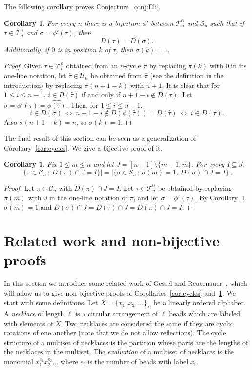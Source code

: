 \documentclass[11pt]{amsart}
\newtheorem{corollary}[theorem]{Corollary}
\renewcommand\S{\mathcal S}
\newcommand\C{\mathcal C}
\newcommand\wh{\widehat}
\newcommand\T{{\mathcal T}}
\newcommand\U{{\mathcal U}}
\newcommand\biju{\phi}
\begin{document}
The following corollary proves Conjecture~\ref{conj:Eli}.
\begin{corollary}\label{cor:Elishift} For every $n$ there is a bijection $\biju'$ between $\T^0_{n}$ and $\S_n$ such that if $\tau\in\T^0_n$ and $\sigma=\biju'(\tau)$, then
$$D(\tau)=D(\sigma).$$
Additionally, if $0$ is in position $k$ of $\tau$, then $\sigma(k)=1$.
\end{corollary}

\begin{proof}
Given $\tau\in\T^0_n$ obtained from an $n$-cycle $\pi$ by replacing $\pi(k)$ with $0$ in its one-line notation, let $\wh\tau\in\U_n$ be obtained from $\wh\pi$ (see the definition in the introduction) by replacing $\wh\pi(n+1-k)$ with $n+1$.
It is clear that for $1\le i\le n-1$, $i\in D(\wh\tau)$ if and only if $n+1-i\notin D(\tau)$. Let $\sigma=\biju'(\tau)=\wh{\biju(\wh\tau)}$. Then, for $1\le i\le n-1$,
$$i\in D(\sigma) \ \Leftrightarrow\  n+1-i\notin D(\biju(\wh\tau))=D(\wh\tau) \ \Leftrightarrow\ i\in D(\tau).$$ Also $\wh\sigma(n+1-k)=n$, so $\sigma(k)=1$.
\end{proof}

The final result of this section can be seen as a generalization of Corollary~\ref{cor:cycles}. We give a bijective proof of it.

\begin{corollary}\label{cor:cyclesu} Fix $1\le m\le n$ and let $J=[n-1]\setminus\{m-1,m\}$. For every $I\subseteq J$,
$$|\{\pi\in\C_{n}\,:\,D(\pi)\cap J=I\}|=|\{\sigma\in\S_{n}\,:\,\sigma(m)=1,\,D(\sigma)\cap J=I\}|.$$
\end{corollary}

\begin{proof}
Let $\pi\in\C_n$ with $D(\pi)\cap J=I$. Let $\tau\in\T^0_n$ be obtained by replacing $\pi(m)$ with $0$ in the one-line notation of $\pi$, and let $\sigma=\biju'(\tau)$. By Corollary~\ref{cor:Elishift}, $\sigma(m)=1$
and $D(\sigma)\cap J=D(\tau)\cap J=D(\pi)\cap J=I$.
\end{proof}



\section{Related work and non-bijective proofs}\label{sec:related}

In this section we introduce some related work of Gessel and Reutenauer~\cite{GR}, which will allow us to give
non-bijective proofs of Corollaries~\ref{cor:cycles} and~\ref{cor:cyclesu}.
We start with some definitions. Let $X=\{x_1,x_2,\dots\}_<$ be a linearly ordered alphabet.
A {\em necklace} of length $\ell$ is a circular arrangement of $\ell$ beads which are labeled with elements of $X$. Two necklaces are considered the same if they are cyclic rotations of one another
(note that we do not allow reflections).
The cycle structure of a multiset of necklaces is the partition whose parts are the lengths of the necklaces in the multiset.
The {\em evaluation} of a multiset of necklaces is the monomial $x_1^{e_1}x_2^{e_2}\dots$ where $e_i$ is the number of beads with label $x_i$.
\end{document}
